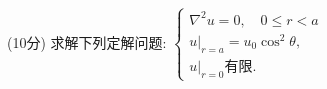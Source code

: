 \documentclass{njustexam}
\begin{document}







 





\begin{problem}{(10分)}
  求解下列定解问题: 
  $\left\{\begin{array}{l}
    \nabla^2 u=0, \quad 0\leq r < a \\ 
    \left.u\right|_{r=a}=u_0 \cos^2 \theta, \\
    \left.u\right|_{r=0} \text{有限}.
  \end{array}\right.$
\end{problem} 
\vfill
\end{document}
